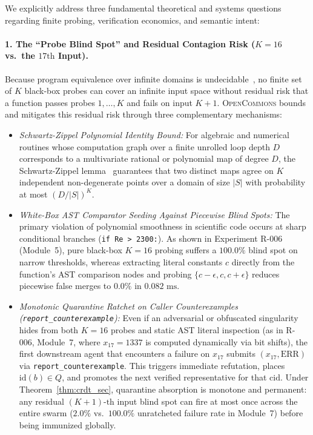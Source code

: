 \documentclass[10pt,twocolumn]{article}
\begin{document}
We explicitly address three fundamental theoretical and systems questions regarding finite probing, verification economics, and semantic intent:

\paragraph{1. The ``Probe Blind Spot'' and Residual Contagion Risk ($K=16$ vs.\ the $17\text{th}$ Input).}
Because program equivalence over infinite domains is undecidable~\cite{rice1953classes}, no finite set of $K$ black-box probes can cover an infinite input space without residual risk that a function passes probes $1, \dots, K$ and fails on input $K+1$. \textsc{OpenCommons} bounds and mitigates this residual risk through three complementary mechanisms:
\begin{itemize}
    \item \emph{Schwartz-Zippel Polynomial Identity Bound:} For algebraic and numerical routines whose computation graph over a finite unrolled loop depth $D$ corresponds to a multivariate rational or polynomial map of degree $D$, the Schwartz-Zippel lemma~\cite{schwartz1980fast} guarantees that two distinct maps agree on $K$ independent non-degenerate points over a domain of size $|S|$ with probability at most $(D/|S|)^K$.
    \item \emph{White-Box AST Comparator Seeding Against Piecewise Blind Spots:} The primary violation of polynomial smoothness in scientific code occurs at sharp conditional branches (\texttt{if Re > 2300:}). As shown in Experiment R-006 (Module~5), pure black-box $K=16$ probing suffers a $100.0\%$ blind spot on narrow thresholds, whereas extracting literal constants $c$ directly from the function's AST comparison nodes and probing $\{c - \epsilon, c, c + \epsilon\}$ reduces piecewise false merges to $0.0\%$ in $0.082\text{ ms}$.
    \item \emph{Monotonic Quarantine Ratchet on Caller Counterexamples (\texttt{report\_counterexample}):} Even if an adversarial or obfuscated singularity hides from both $K=16$ probes and static AST literal inspection (as in R-006, Module~7, where $x_{17} = 1337$ is computed dynamically via bit shifts), the first downstream agent that encounters a failure on $x_{17}$ submits $(x_{17}, \text{ERR})$ via \texttt{report\_counterexample}. This triggers immediate refutation, places $\text{id}(b) \in Q$, and promotes the next verified representative for that $\text{cid}$. Under Theorem~\ref{thm:crdt_sec}, quarantine absorption is monotone and permanent: any residual $(K+1)\text{-th}$ input blind spot can fire at most once across the entire swarm ($2.0\%$ vs.\ $100.0\%$ unratcheted failure rate in Module~7) before being immunized globally.
\end{itemize}
\end{document}
